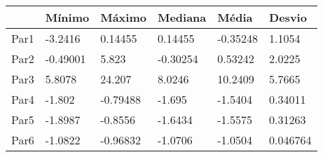 \begin{tabular}{llllll}
& Mínimo & Máximo & Mediana & Média & Desvio \\ 
\hline 
Par1 & -3.2416 & 0.14455 & 0.14455 & -0.35248 & 1.1054 \\ 
Par2 & -0.49001 & 5.823 & -0.30254 & 0.53242 & 2.0225 \\ 
Par3 & 5.8078 & 24.207 & 8.0246 & 10.2409 & 5.7665 \\ 
Par4 & -1.802 & -0.79488 & -1.695 & -1.5404 & 0.34011 \\ 
Par5 & -1.8987 & -0.8556 & -1.6434 & -1.5575 & 0.31263 \\ 
Par6 & -1.0822 & -0.96832 & -1.0706 & -1.0504 & 0.046764 \\ 
\hline 
\end{tabular}
